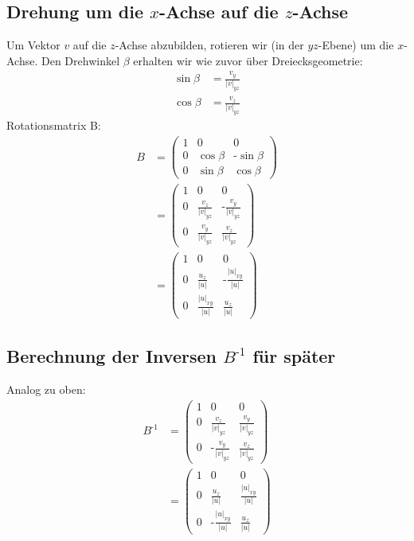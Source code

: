 \documentclass[a4paper]{scrartcl}
\begin{document}
\subsection*{Drehung um die $x$-Achse auf die $z$-Achse}
Um Vektor $v$ auf die $z$-Achse abzubilden, rotieren wir (in der $yz$-Ebene) um die $x$-Achse. Den Drehwinkel $\beta$ erhalten wir wie zuvor über Dreiecksgeometrie:
\begin{align*}
\sin\beta & = \frac{v_y}{\left|v\right|_{yz}} \\
\cos\beta & = \frac{v_z}{\left|v\right|_{yz}}
\end{align*}
Rotationsmatrix B:
\begin{align*}
B & = \begin{pmatrix} 1 & 0 & 0 \\ 0 & \cos\beta & \text{-}\sin\beta\\ 0 & \sin\beta & \cos\beta \end{pmatrix}
\\
& = \begin{pmatrix} 1 & 0 & 0 \\ 0 & \frac{v_z}{\left|v\right|_{yz}} & \text{-}\frac{v_y}{\left|v\right|_{yz}} \\ 0 & \frac{v_y}{\left|v\right|_{yz}} & \frac{v_z}{\left|v\right|_{yz}} \end{pmatrix}
\\
& = \begin{pmatrix} 1 & 0 & 0 \\ 0 & \frac{u_z}{\left|u\right|} & \text{-}\frac{\left|u\right|_{xy}}{\left|u\right|} \\ 0 & \frac{\left|u\right|_{xy}}{\left|u\right|} & \frac{u_z}{\left|u\right|} \end{pmatrix}
\end{align*}

\subsection*{Berechnung der Inversen $B^{\text{-}1}$ für später}
Analog zu oben:
\begin{align*}
B^{\text{-}1} & = 
\begin{pmatrix}
1 & 0 & 0 \\
0 & \frac{v_z}{\left|v\right|_{yz}} & \frac{v_y}{\left|v\right|_{yz}}\\
0 & \text{-}\frac{v_y}{\left|v\right|_{yz}} & \frac{v_z}{\left|v\right|_{yz}}
\end{pmatrix}
\\ & =
\begin{pmatrix}
1 & 0 & 0 \\
0 & \frac{u_z}{\left|u\right|} & \frac{\left|u\right|_{xy}}{\left|u\right|}\\
0 & \text{-}\frac{\left|u\right|_{xy}}{\left|u\right|} & \frac{u_z}{\left|u\right|}
\end{pmatrix}
\end{align*}
\end{document}
